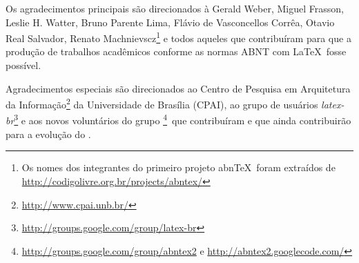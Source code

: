 \begin{agradecimentos}
  Os agradecimentos principais são direcionados à Gerald Weber, Miguel Frasson,
  Leslie H. Watter, Bruno Parente Lima, Flávio de Vasconcellos Corrêa, Otavio Real
  Salvador, Renato Machnievscz\footnote{Os nomes dos integrantes do primeiro
    projeto abn\TeX\ foram extraídos de
    \url{http://codigolivre.org.br/projects/abntex/}} e todos aqueles que
  contribuíram para que a produção de trabalhos acadêmicos conforme
  as normas ABNT com \LaTeX\ fosse possível.

  Agradecimentos especiais são direcionados ao Centro de Pesquisa em Arquitetura
  da Informação\footnote{\url{http://www.cpai.unb.br/}} da Universidade de
  Brasília (CPAI), ao grupo de usuários
  \emph{latex-br}\footnote{\url{http://groups.google.com/group/latex-br}} e aos
  novos voluntários do grupo
  \emph{\abnTeX}\footnote{\url{http://groups.google.com/group/abntex2} e
    \url{http://abntex2.googlecode.com/}}~que contribuíram e que ainda
  contribuirão para a evolução do \abnTeX.

\end{agradecimentos}
